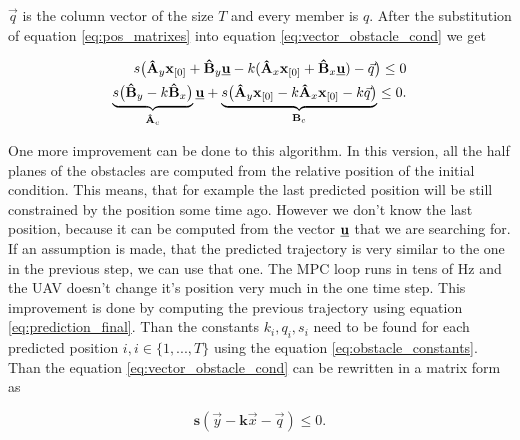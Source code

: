 \documentclass{article}
\newcommand{\uvec}{\textbf{\underline{u}}}
\begin{document}
$\vec{q}$ is the column vector of the size $T$ and every member is $q$.
 After the substitution of equation \ref{eq:pos_matrixes} into equation \ref{eq:vector_obstacle_cond} we get
 
\begin{equation}
\begin{split}
s\big(\textbf{\^A}_y \textbf{x}_{[0]} + \textbf{\^B}_y \uvec - k(\textbf{\^A}_x \textbf{x}_{[0]} + \textbf{\^B}_x \uvec) - \vec{q}\big) \leq 0 \\
\underbrace{s\big(\textbf{\^B}_y-k\textbf{\^B}_x\big)}_{\textbf{\^A}_c} \uvec +
\underbrace{s\big(\textbf{\^A}_y \textbf{x}_{[0]} - k\textbf{\^A}_x \textbf{x}_{[0]} -k\vec{q}\big)}_{\textbf{B}_c} \leq 0.
\end{split}
\end{equation}

One more improvement can be done to this algorithm. In this version, all the half planes of the obstacles are computed from the relative position of the initial condition. This means, that for example the last predicted position will be still constrained by the position some time ago. However we don't know the last position, because it can be computed from the vector $\uvec$ that we are searching for. If an assumption is made, that the predicted trajectory is very similar to the one in the previous step, we can use that one. The MPC loop runs in tens of Hz and the UAV doesn't change it's position very much in the one time step. This improvement is done by computing the previous trajectory using equation \ref{eq:prediction_final}. Than the constants $k_{i}, q_{i}, s_{i}$ need to be found for each predicted position $i, i\in\{1,...,T\}$ using the equation \ref{eq:obstacle_constants}. Than the equation \ref{eq:vector_obstacle_cond} can be rewritten in a matrix form as

\begin{equation}
\label{eq:matrix_obstacle_cond}
\textbf{s}(\vec{y} - \textbf{k}\vec{x} - \vec{q}) \leq 0.
\end{equation}
\end{document}
